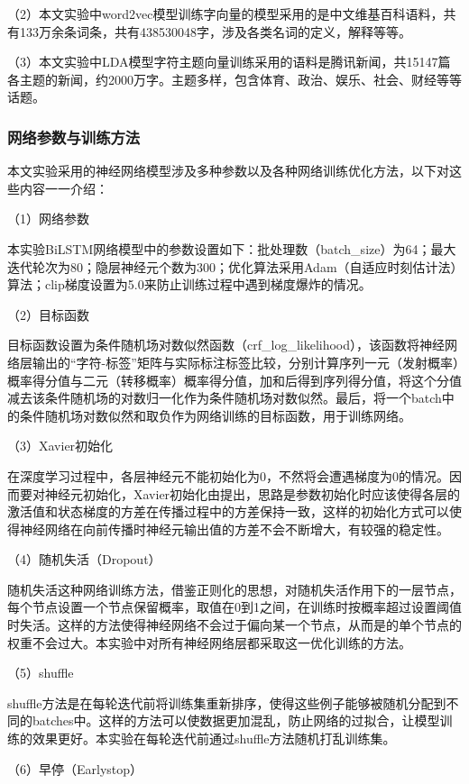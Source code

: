 \documentclass[winfonts,master,oneside,nobackinfo]{njuthesis}
\begin{document}
（2）本文实验中word2vec模型训练字向量的模型采用的是中文维基百科语料，共有133万余条词条，共有438530048字，涉及各类名词的定义，解释等等。

（3）本文实验中LDA模型字符主题向量训练采用的语料是腾讯新闻，共15147篇各主题的新闻，约2000万字。主题多样，包含体育、政治、娱乐、社会、财经等等话题。

\subsubsection{网络参数与训练方法}

本文实验采用的神经网络模型涉及多种参数以及各种网络训练优化方法，以下对这些内容一一介绍：

（1）网络参数

本实验BiLSTM网络模型中的参数设置如下：批处理数（batch\_size）为64；最大迭代轮次为80；隐层神经元个数为300；优化算法采用Adam\cite{Adam}（自适应时刻估计法）算法；clip梯度设置为5.0来防止训练过程中遇到梯度爆炸的情况。

（2）目标函数

目标函数设置为条件随机场对数似然函数（crf\_log\_likelihood），该函数将神经网络层输出的“字符-标签”矩阵与实际标注标签比较，分别计算序列一元（发射概率）概率得分值与二元（转移概率）概率得分值，加和后得到序列得分值，将这个分值减去该条件随机场的对数归一化作为条件随机场对数似然。最后，将一个batch中的条件随机场对数似然和取负作为网络训练的目标函数，用于训练网络。

（3）Xavier初始化

在深度学习过程中，各层神经元不能初始化为0，不然将会遭遇梯度为0的情况。因而要对神经元初始化，Xavier初始化由\cite{Xavier}提出，思路是参数初始化时应该使得各层的激活值和状态梯度的方差在传播过程中的方差保持一致，这样的初始化方式可以使得神经网络在向前传播时神经元输出值的方差不会不断增大，有较强的稳定性。

（4）随机失活（Dropout）

随机失活这种网络训练方法，借鉴正则化的思想，对随机失活作用下的一层节点，每个节点设置一个节点保留概率，取值在0到1之间，在训练时按概率超过设置阈值时失活。这样的方法使得神经网络不会过于偏向某一个节点，从而是的单个节点的权重不会过大。本实验中对所有神经网络层都采取这一优化训练的方法。

（5）shuffle

shuffle方法是在每轮迭代前将训练集重新排序，使得这些例子能够被随机分配到不同的batches中。这样的方法可以使数据更加混乱，防止网络的过拟合，让模型训练的效果更好。本实验在每轮迭代前通过shuffle方法随机打乱训练集。

（6）早停（Earlystop）
\end{document}
